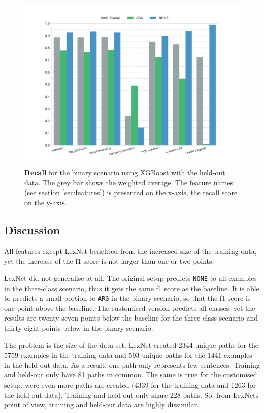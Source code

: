    \begin{figure}[htbp]
              \caption{\textbf{Recall} for the binary scenario using XGBoost with the held-out data. The grey bar shows the weighted average. The feature names (see section \ref{sec:features}) is presented on the x-axis, the recall score on the y-axis.} 
       \label{fig:h_2_rec}
 \centering
	\includegraphics[width=0.9\linewidth]{images/heldout/h-recall-True}

\end{figure}
\FloatBarrier
\subsection{Discussion}
All features except LexNet benefited from the increased size of the training data, yet the increase of the f1 score is not larger than one or two points.\newline

LexNet did not generalise at all. The original setup predicts \texttt{NONE} to all examples in the three-class scenario, thus it gets the same f1 score as the baseline. It is able to predicts a small portion to \texttt{ARG} in the binary scenario, so that the f1 score is one point above the baseline. The customised version predicts all classes, yet the results are twenty-seven points below the baseline for the three-class scenario and thirty-eight points below in the binary scenario.

The problem is the size of the data set. LexNet created 2344 unique paths for the 5759 examples in the training data and 593 unique paths for the 1441 examples in the held-out data. As a result, one path only represents few sentences. Training and held-out only have 81 paths in common. The same is true for the customised setup, were even more paths are created (4339 for the training data and 1263 for the held-out data). Training and held-out only share 228 paths. So, from LexNets point of view, training and held-out data are highly dissimilar.

